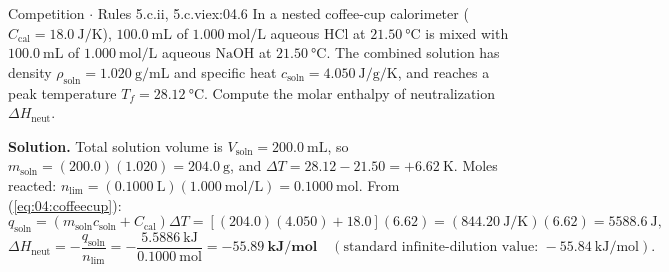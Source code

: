 \begin{workedexample}[Isobaric Coffee-Cup Neutralization Enthalpy ($\mathrm{HCl + NaOH}$, $q_P = \Delta H$)]{Competition $\cdot$ Rules 5.c.ii, 5.c.vi}{ex:04.6}
In a nested coffee-cup calorimeter ($C_{\mathrm{cal}} = \SI{18.0}{\joule\per\kelvin}$), $\SI{100.0}{\milli\liter}$ of $\SI{1.000}{\mole\per\liter}$ aqueous $\mathrm{HCl}$ at $\SI{21.50}{\celsius}$ is mixed with $\SI{100.0}{\milli\liter}$ of $\SI{1.000}{\mole\per\liter}$ aqueous $\mathrm{NaOH}$ at $\SI{21.50}{\celsius}$. The combined solution has density $\rho_{\mathrm{soln}} = \SI{1.020}{\gram\per\milli\liter}$ and specific heat $c_{\mathrm{soln}} = \SI{4.050}{\joule\per\gram\per\kelvin}$, and reaches a peak temperature $T_f = \SI{28.12}{\celsius}$. Compute the molar enthalpy of neutralization $\Delta H_{\mathrm{neut}}$.

\textbf{Solution.}
Total solution volume is $V_{\mathrm{soln}} = \SI{200.0}{\milli\liter}$, so $m_{\mathrm{soln}} = (200.0)(1.020) = \SI{204.0}{\gram}$, and $\Delta T = 28.12 - 21.50 = +\SI{6.62}{\kelvin}$. Moles reacted: $n_{\mathrm{lim}} = (\SI{0.1000}{\liter})(\SI{1.000}{\mole\per\liter}) = \SI{0.1000}{\mole}$. From (\ref{eq:04:coffeecup}):
\[
  q_{\mathrm{soln}} = (m_{\mathrm{soln}} c_{\mathrm{soln}} + C_{\mathrm{cal}})\Delta T = \left[(204.0)(4.050) + 18.0\right](6.62) = (\SI{844.20}{\joule\per\kelvin})(6.62) = \SI{5588.6}{\joule},
\]
\[
  \Delta H_{\mathrm{neut}} = -\frac{q_{\mathrm{soln}}}{n_{\mathrm{lim}}} = -\frac{\SI{5.5886}{\kilo\joule}}{\SI{0.1000}{\mole}} = \mathbf{-\SI{55.89}{\kilo\joule\per\mole}} \quad (\text{standard infinite-dilution value: } -\SI{55.84}{\kilo\joule\per\mole}).
\]
\end{workedexample}


